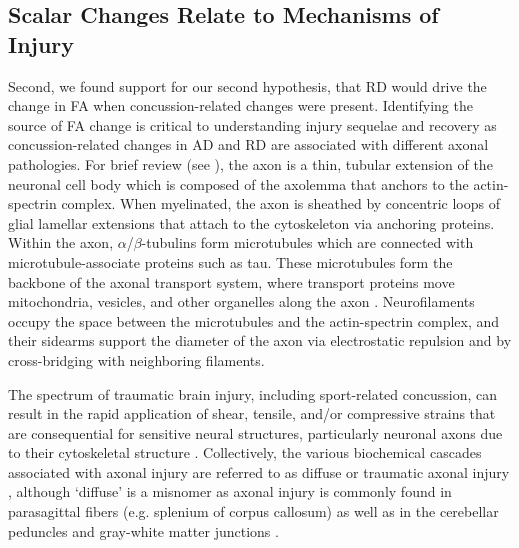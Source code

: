 \documentclass[12pt]{article}
\begin{document}
\subsection{Scalar Changes Relate to Mechanisms of Injury}
\label{ssec:disc-tract}
Second, we found support for our second hypothesis, that RD would drive the change in FA when concussion-related changes were present. Identifying the source of FA change is critical to understanding injury sequelae and recovery as concussion-related changes in AD and RD are associated with different axonal pathologies. For brief review (see \textcite{krieg2023IdentifyingPhenotypesDiffuse}), the axon is a thin, tubular extension of the neuronal cell body which is composed of the axolemma that anchors to the actin-spectrin complex. When myelinated, the axon is sheathed by concentric loops of glial lamellar extensions that attach to the cytoskeleton via anchoring proteins. Within the axon, $\alpha$/$\beta$-tubulins form microtubules which are connected with microtubule-associate proteins such as tau. These microtubules form the backbone of the axonal transport system, where transport proteins move mitochondria, vesicles, and other organelles along the axon \parencite{shin2020AxonalTransportDysfunction}. Neurofilaments occupy the space between the microtubules and the actin-spectrin complex, and their sidearms support the diameter of the axon via electrostatic repulsion and by cross-bridging with neighboring filaments.

The spectrum of traumatic brain injury, including sport-related concussion, can result in the rapid application of shear, tensile, and/or compressive strains that are consequential for sensitive neural structures, particularly neuronal axons due to their cytoskeletal structure \parencite{elsayed2008BiomechanicsTraumaticBrain,johnson2013AxonalPathologyTraumatic,bar-kochba2016StrainRatedependentNeuronal}. Collectively, the various biochemical cascades associated with axonal injury are referred to as diffuse or traumatic axonal injury \parencite{krieg2023IdentifyingPhenotypesDiffuse}, although `diffuse' is a misnomer as axonal injury is commonly found in parasagittal fibers (e.g. splenium of corpus callosum) as well as in the cerebellar peduncles and gray-white matter junctions \parencite{jang2020DiagnosticProblemsDiffuse,fork2005NeuropsychologicalSequelaeDiffuse,meythaler2001CurrentConceptsDiffuse,johnson2013AxonalPathologyTraumatic,lindsey2023DiffusionWeightedImagingMild}.
\end{document}

